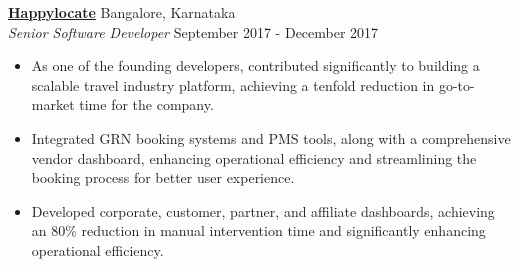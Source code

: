\textbf{\href{https://www.happylocate.com/}{Happylocate}} \hfill Bangalore, Karnataka\\
\textit{Senior Software Developer} \hfill September 2017 - December 2017
\begin{itemize}[leftmargin=*]
  \itemsep0em
  \item As one of the founding developers, contributed significantly to building a scalable travel industry platform, achieving a tenfold reduction in go-to-market time for the company.
  \item Integrated GRN booking systems and PMS tools, along with a comprehensive vendor dashboard, enhancing operational efficiency and streamlining the booking process for better user experience.
  \item Developed corporate, customer, partner, and affiliate dashboards, achieving an 80\% reduction in manual intervention time and significantly enhancing operational efficiency.
\end{itemize}
